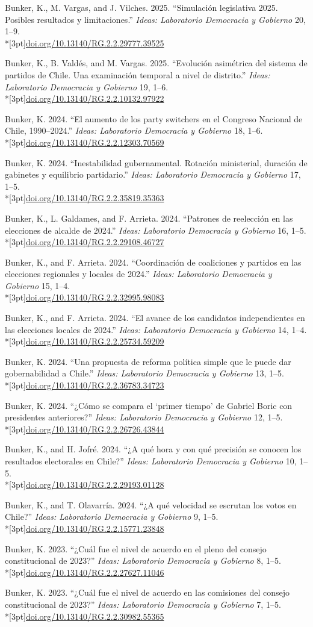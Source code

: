 \documentclass[11pt,letterpaper]{article}
\newif\ifafterhead
\newlength{\entrygap}\setlength{\entrygap}{8.5pt}
\newcommand{\gap}{\ifafterhead\global\afterheadfalse\else\vspace{\entrygap}\fi}
\newcommand{\entry}[1]{\par\gap\hangindent=13pt\hangafter=1\noindent #1\par}
\newcommand{\doi}[1]{\\*[3pt]{\small\href{https://doi.org/#1}{doi.org/#1}}}
\newcommand{\ideas}{\textit{Ideas: Laboratorio Democracia y Gobierno}}
\begin{document}
\entry{Bunker, K., M. Vargas, and J. Vilches. 2025. ``Simulación legislativa 2025. Posibles resultados y limitaciones.'' \ideas{} 20, 1--9.\doi{10.13140/RG.2.2.29777.39525}}

\entry{Bunker, K., B. Valdés, and M. Vargas. 2025. ``Evolución asimétrica del sistema de partidos de Chile. Una examinación temporal a nivel de distrito.'' \ideas{} 19, 1--6.\doi{10.13140/RG.2.2.10132.97922}}

\entry{Bunker, K. 2024. ``El aumento de los party switchers en el Congreso Nacional de Chile, 1990--2024.'' \ideas{} 18, 1--6.\doi{10.13140/RG.2.2.12303.70569}}

\entry{Bunker, K. 2024. ``Inestabilidad gubernamental. Rotación ministerial, duración de gabinetes y equilibrio partidario.'' \ideas{} 17, 1--5.\doi{10.13140/RG.2.2.35819.35363}}

\entry{Bunker, K., L. Galdames, and F. Arrieta. 2024. ``Patrones de reelección en las elecciones de alcalde de 2024.'' \ideas{} 16, 1--5.\doi{10.13140/RG.2.2.29108.46727}}

\entry{Bunker, K., and F. Arrieta. 2024. ``Coordinación de coaliciones y partidos en las elecciones regionales y locales de 2024.'' \ideas{} 15, 1--4.\doi{10.13140/RG.2.2.32995.98083}}

\entry{Bunker, K., and F. Arrieta. 2024. ``El avance de los candidatos independientes en las elecciones locales de 2024.'' \ideas{} 14, 1--4.\doi{10.13140/RG.2.2.25734.59209}}

\entry{Bunker, K. 2024. ``Una propuesta de reforma política simple que le puede dar gobernabilidad a Chile.'' \ideas{} 13, 1--5.\doi{10.13140/RG.2.2.36783.34723}}

\entry{Bunker, K. 2024. ``¿Cómo se compara el `primer tiempo' de Gabriel Boric con presidentes anteriores?'' \ideas{} 12, 1--5.\doi{10.13140/RG.2.2.26726.43844}}

\entry{Bunker, K., and H. Jofré. 2024. ``¿A qué hora y con qué precisión se conocen los resultados electorales en Chile?'' \ideas{} 10, 1--5.\doi{10.13140/RG.2.2.29193.01128}}

\entry{Bunker, K., and T. Olavarría. 2024. ``¿A qué velocidad se escrutan los votos en Chile?'' \ideas{} 9, 1--5.\doi{10.13140/RG.2.2.15771.23848}}

\entry{Bunker, K. 2023. ``¿Cuál fue el nivel de acuerdo en el pleno del consejo constitucional de 2023?'' \ideas{} 8, 1--5.\doi{10.13140/RG.2.2.27627.11046}}

\entry{Bunker, K. 2023. ``¿Cuál fue el nivel de acuerdo en las comisiones del consejo constitucional de 2023?'' \ideas{} 7, 1--5.\doi{10.13140/RG.2.2.30982.55365}}
\end{document}
